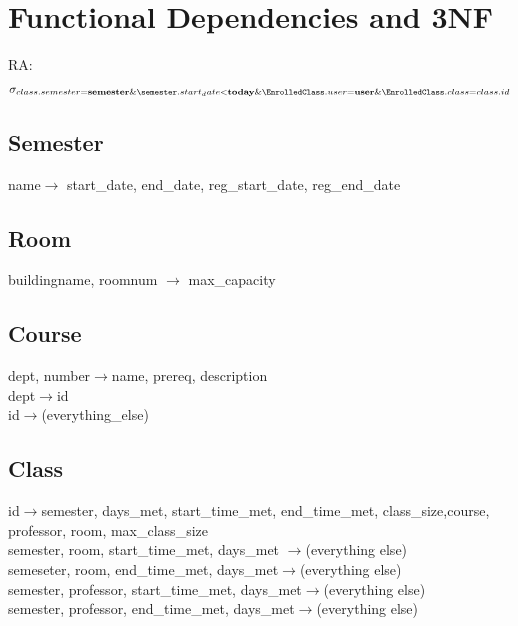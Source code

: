 \documentclass[11pt,oneside,a4paper]{article}
\begin{document}
\section{Functional Dependencies and 3NF}

RA:
\begin{align*}
\sigma_{class.semester = \textbf{semester} \&
 \semester.start_date < \textbf{today} \&
  \EnrolledClass.user = \textbf{user} \&
   \EnrolledClass.class = class.id}
\end{align*}


\subsection{Semester}
\hspace{0.5in}name$\rightarrow$ start\_date, end\_date, reg\_start\_date, reg\_end\_date  


\subsection{Room}
\hspace*{0.5in}buildingname, roomnum $\rightarrow$ max\_capacity


\subsection{Course}
\hspace*{0.5in}dept, number$\rightarrow$name, prereq, description \\
\hspace*{0.5in}dept$\rightarrow$id \\
\hspace*{0.5in}id$\rightarrow$(everything\_else) 


\subsection{Class}
\hspace*{0.5in}id$\rightarrow$semester, days\_met, start\_time\_met, end\_time\_met, class\_size,course, professor, room, max\_class\_size \\
\hspace*{0.5in}semester, room, start\_time\_met, days\_met $\rightarrow$(everything else) \\
\hspace*{0.5in}semeseter, room, end\_time\_met, days\_met$\rightarrow$(everything else) \\
\hspace*{0.5in}semester, professor, start\_time\_met, days\_met$\rightarrow$(everything else) \\
\hspace*{0.5in}semester, professor, end\_time\_met, days\_met$\rightarrow$(everything else) 
\end{document}
